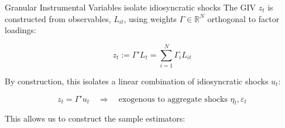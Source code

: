 \documentclass[aspectratio=169,11pt]{beamer}
\begin{document}
\begin{frame}{Granular Instrumental Variables isolate idiosyncratic shocks} \label{app_propositions}
    \vspace{0.2cm}
    \centering
    The GIV $z_t$ is constructed from observables, $L_{it}$, using weights $\Gamma \in \mathbb{R}^N$ orthogonal to factor loadings:

    \vspace{0.1cm}
    \begin{equation*}
        z_t := \Gamma' L_t = \sum_{i=1}^{N} \Gamma_i L_{it}
    \end{equation*}

    \vspace{0.1cm}
    By construction, this isolates a linear combination of idiosyncratic shocks $u_t$:

    \vspace{0.1cm}
    \begin{equation*}
        z_t = \Gamma' u_t \quad \Rightarrow \quad \text{exogenous to aggregate shocks } \eta_t, \varepsilon_t
    \end{equation*}

    \vspace{0.2cm}
    This allows us to construct the sample estimators:
    \vspace{0.1cm}

    \vspace{0.1cm}
    \hfill \hyperlink{src_propositions}{}
\end{frame}
\end{document}
